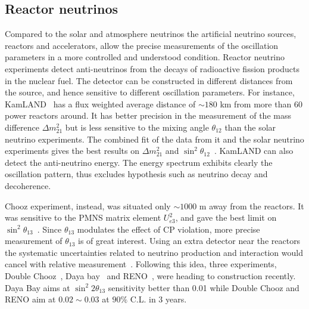 \subsection{Reactor neutrinos}
\label{sec:reactor}
Compared to the solar and atmosphere neutrinos the artificial neutrino sources, reactors and accelerators, allow the precise measurements of the oscillation parameters in a more controlled and understood condition. Reactor neutrino experiments detect anti-neutrinos from the decays of radioactive fission products in the nuclear fuel. The detector can be constructed in different distances from the source, and hence sensitive to different oscillation parameters. For instance, KamLAND~\cite{Kam03} has a flux weighted average distance of $\sim180$ km from more than 60 power reactors around. It has better precision in the measurement of the mass difference $\Delta m^{2}_{21}$ but is less sensitive to the mixing angle $\theta_{12}$ than the solar neutrino experiments. The combined fit of the data from it and the solar neutrino experiments gives the best results on $\Delta m^{2}_{21}$ and $\sin^{2}\theta_{12}$~\cite{Kam08}. KamLAND can also detect the anti-neutrino energy. The energy spectrum exhibits clearly the oscillation pattern, thus excludes hypothesis such as neutrino decay and decoherence.

Chooz experiment, instead, was situated only $\sim1000$ m away from the reactors. It was sensitive to the PMNS matrix element $U_{e3}^{2}$, and gave the best limit on $\sin^{2}\theta_{13}$~\cite{Cho03}. Since $\theta_{13}$ modulates the effect of CP violation, more precise measurement of $\theta_{13}$ is of great interest. Using an extra detector near the reactors the systematic uncertainties related to neutrino production and interaction would cancel with relative measurement~\cite{Koz03}. Following this idea, three experiments, Double Chooz~\cite{Dbc06}, Daya bay~\cite{Day07} and RENO~\cite{Ren08}, were heading to construction recently. Daya Bay aims at $\sin^{2}2\theta_{13}$ sensitivity better than 0.01 while Double Chooz and RENO aim at $0.02 \sim 0.03$ at $90\%$ C.L. in 3 years.

